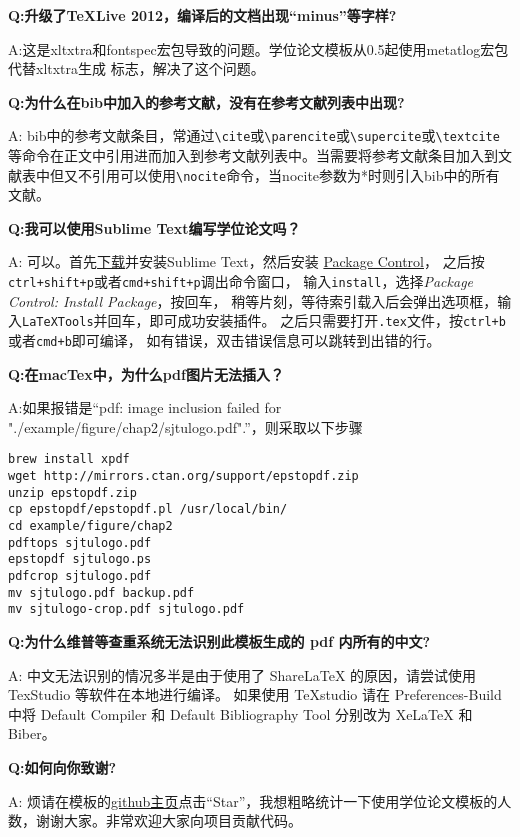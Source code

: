 {\bfseries{}Q:升级了TeXLive 2012，编译后的文档出现“minus”等字样?}

A:这是xltxtra和fontspec宏包导致的问题。学位论文模板从0.5起使用metatlog宏包代替xltxtra生成 \XeTeX 标志，解决了这个问题。

{\bfseries{}Q:为什么在bib中加入的参考文献，没有在参考文献列表中出现?}

A: bib中的参考文献条目，常通过\verb+\cite+或\verb+\parencite+或\verb+\supercite+或\verb+\textcite+等命令在正文中引用进而加入到参考文献列表中。当需要将参考文献条目加入到文献表中但又不引用可以使用\verb+\nocite+命令，当nocite参数为*时则引入bib中的所有文献。

{\bfseries{}Q:我可以使用Sublime Text编写学位论文吗？}

A: 可以。首先\href{https://www.sublimetext.com/}{下载}并安装Sublime Text，然后安装
\href{https://packagecontrol.io/installation}{Package Control}，
之后按\verb|ctrl+shift+p|或者\verb|cmd+shift+p|调出命令窗口，
输入\verb|install|，选择\textit{Package Control: Install Package}，按回车，
稍等片刻，等待索引载入后会弹出选项框，输入\verb|LaTeXTools|并回车，即可成功安装插件。
之后只需要打开\verb|.tex|文件，按\verb|ctrl+b|或者\verb|cmd+b|即可编译，
如有错误，双击错误信息可以跳转到出错的行。

{\bfseries{}Q:在macTex中，为什么pdf图片无法插入？}

A:如果报错是“pdf: image inclusion failed for "./example/figure/chap2/sjtulogo.pdf".”，则采取以下步骤

\begin{lstlisting}[basicstyle=\small\ttfamily, caption={编译模板}, numbers=none]
brew install xpdf
wget http://mirrors.ctan.org/support/epstopdf.zip
unzip epstopdf.zip
cp epstopdf/epstopdf.pl /usr/local/bin/
cd example/figure/chap2
pdftops sjtulogo.pdf
epstopdf sjtulogo.ps
pdfcrop sjtulogo.pdf
mv sjtulogo.pdf backup.pdf
mv sjtulogo-crop.pdf sjtulogo.pdf
\end{lstlisting}

{\bfseries{}Q:为什么维普等查重系统无法识别此模板生成的 pdf 内所有的中文?}

A: 中文无法识别的情况多半是由于使用了 ShareLaTeX 的原因，请尝试使用 TexStudio 等软件在本地进行编译。
如果使用 TeXstudio 请在 Preferences-Build 中将 Default Compiler 和 Default Bibliography Tool 分别改为 XeLaTeX 和 Biber。

{\bfseries{}Q:如何向你致谢?}

A: 烦请在模板的\href{https://github.com/sjtug/SJTUThesis}{github主页}点击“Star”，我想粗略统计一下使用学位论文模板的人数，谢谢大家。非常欢迎大家向项目贡献代码。
